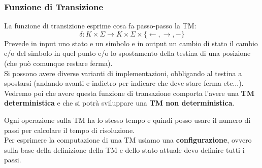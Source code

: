 \subsubsection{Funzione di Transizione}
\begin{definizione}
  La funzione di transizione esprime cosa fa passo-passo la TM:
  \[\delta:K\times\Sigma\to K\times \Sigma\times\{\leftarrow,\rightarrow,-\}\]
  Prevede in input uno stato e un simbolo e in output un cambio
  di stato il cambio e/o del simbolo in quel punto e/o lo spostamento della
  testina di una posizione (che può comunque restare ferma).\\
  Si possono avere diverse varianti di implementazioni, obbligando al testina a
  spostarsi (andando avanti e indietro per indicare che deve stare ferma
  etc$\ldots$).\\
  Vedremo poi che avere questa funzione di transazione comporta l'avere una
  \textbf{TM deterministica} e che si potrà sviluppare una \textbf{TM non
    deterministica}.
\end{definizione}
Ogni operazione sulla TM ha lo stesso tempo e quindi posso usare il numero di
passi per calcolare il tempo di risoluzione.\\
Per esprimere la computazione di una TM usiamo una \textbf{configurazione},
ovvero sulla base della definizione della TM e dello stato attuale devo
definire tutti i passi.
